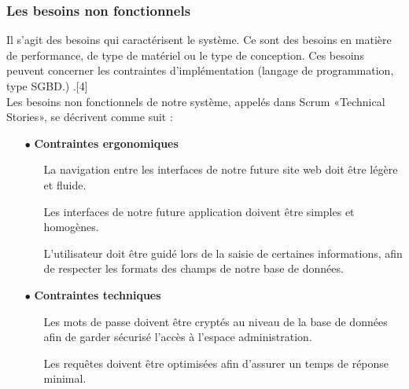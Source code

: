 \documentclass{article}
\begin{document}
\subsubsection{Les besoins non fonctionnels}
\guillemotleft Il s’agit des besoins qui caractérisent le système. Ce sont des besoins en matière de performance, de type de matériel ou le type de conception. Ces besoins peuvent concerner les contraintes d’implémentation (langage de programmation, type SGBD.) \guillemotright.[4]\\
Les besoins non fonctionnels de notre système, appelés dans Scrum «Technical Stories», se décrivent comme suit :
\begin{enumerate}
\item [$\bullet$] \textbf{Contraintes ergonomiques}
	\begin{enumerate}
     		\item [\textendash] La navigation entre les interfaces de notre future site web doit être légère et fluide.
     		\item [\textendash] Les interfaces de notre future application doivent être simples et homogènes.
     		\item [\textendash] L’utilisateur doit être guidé lors de la saisie de certaines informations, afin de respecter les formats des champs de notre base de données.
     \end{enumerate} 
\item [$\bullet$] \textbf{Contraintes techniques} 
	\begin{enumerate}
     		\item [\textendash] Les mots de passe doivent être cryptés au niveau de la base de données afin de garder sécurisé l’accès à l’espace administration.
     		\item [\textendash] Les requêtes doivent être optimisées afin d’assurer un temps de réponse minimal.
     		
     \end{enumerate}  
\end{enumerate}
\end{document}
